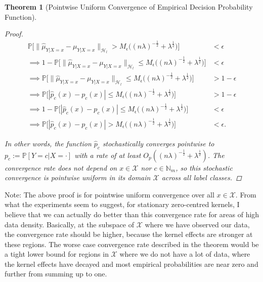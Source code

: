 \documentclass{article}
\newcommand{\note}[1]{{\color{orange} #1}}
\newtheorem{theorem}{Theorem}[section]
\begin{document}
\begin{theorem}[Pointwise Uniform Convergence of Empirical Decision Probability Function]
\begin{proof}
		\begin{equation}
		\begin{aligned}
			\mathbb{P}\Big[\big\| \hat{\mu}_{Y | X = x} - \mu_{Y | X = x} \big\|_{\mathcal{H}_{l}} > M_{\epsilon} \Big((n \lambda)^{-\frac{1}{2}} + \lambda^{\frac{1}{2}}\Big)\Big] &< \epsilon \\
			\implies 1 - \mathbb{P}\Big[\big\| \hat{\mu}_{Y | X = x} - \mu_{Y | X = x} \big\|_{\mathcal{H}_{l}} \leq M_{\epsilon} \Big((n \lambda)^{-\frac{1}{2}} + \lambda^{\frac{1}{2}}\Big)\Big] &< \epsilon \\
			\implies \mathbb{P}\Big[\big\| \hat{\mu}_{Y | X = x} - \mu_{Y | X = x} \big\|_{\mathcal{H}_{l}} \leq M_{\epsilon} \Big((n \lambda)^{-\frac{1}{2}} + \lambda^{\frac{1}{2}}\Big)\Big] &> 1 -  \epsilon \\
			\implies \mathbb{P}\Big[| \hat{p}_{c}(x) - p_{c}(x) | \leq M_{\epsilon} \Big((n \lambda)^{-\frac{1}{2}} + \lambda^{\frac{1}{2}}\Big)\Big] &> 1 -  \epsilon \\
			\implies 1 - \mathbb{P}\Big[| \hat{p}_{c}(x) - p_{c}(x) | \leq M_{\epsilon} \Big((n \lambda)^{-\frac{1}{2}} + \lambda^{\frac{1}{2}}\Big)\Big] &< \epsilon \\
			\implies \mathbb{P}\Big[| \hat{p}_{c}(x) - p_{c}(x) | > M_{\epsilon} \Big((n \lambda)^{-\frac{1}{2}} + \lambda^{\frac{1}{2}}\Big)\Big] &< \epsilon.
		\end{aligned}	
		\end{equation}
		
		In other words, the function $\hat{p}_{c}$ stochastically converges pointwise to $p_{c} := \mathbb{P}[Y = c | X = \cdot]$ with a rate of at least $O_{p}((n \lambda)^{-\frac{1}{2}} + \lambda^{\frac{1}{2}})$. The convergence rate does not depend on $x \in \mathcal{X}$ nor $c \in \mathbb{N}_{m}$, so this stochastic convergence is pointwise uniform in its domain $\mathcal{X}$ across all label classes.
		
	\end{proof}
	\end{theorem}
	
	\note{Note: The above proof is for pointwise uniform convergence over all $x \in \mathcal{X}$. From what the experiments seem to suggest, for stationary zero-centred kernels, I believe that we can actually do better than this convergence rate for areas of high data density. Basically, at the subspace of $\mathcal{X}$ where we have observed our data, the convergence rate should be higher, because the kernel effects are stronger at these regions. The worse case convergence rate described in the theorem would be a tight lower bound for regions in $\mathcal{X}$ where we do not have a lot of data, where the kernel effects have decayed and most empirical probabilities are near zero and further from summing up to one.}
	
\end{document}
